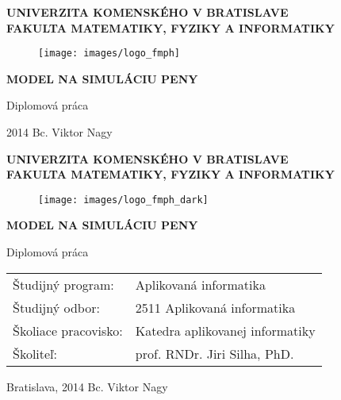 \documentclass[12pt, a4paper, oneside]{book}
\newcommand\mftitle{Model na simuláciu peny}
\newcommand\mfthesistype{Diplomová práca}
\newcommand\mfauthor{Bc. Viktor Nagy}
\newcommand\mfadvisor{prof. RNDr. Jiri Silha, PhD.}
\newcommand\mfplacedate{Bratislava, 2014}
\newcommand\mfuniversity{UNIVERZITA KOMENSKÉHO V BRATISLAVE}
\newcommand\mffaculty{FAKULTA MATEMATIKY, FYZIKY A INFORMATIKY}
\begin{document}
\frontmatter

\thispagestyle{empty}

\noindent
\begin{minipage}{\textwidth}
\begin{center}
\textbf{\mfuniversity \\
\mffaculty}
\end{center}
\end{minipage}

\vfill
\begin{figure}[!hbt]
	\begin{center}
		\texttt{[image: images/logo\_fmph]}
		\label{img:logo}
	\end{center}
\end{figure}
\begin{center}
	\begin{minipage}{0.8\textwidth}
		\centerline{\textbf{\Large\MakeUppercase{\mftitle}}}
		\smallskip
		\centerline{\mfthesistype}
	\end{minipage}
\end{center}
\vfill
2014 \hfill
\mfauthor
\eject 

\thispagestyle{empty}

\noindent
\begin{minipage}{\textwidth}
\begin{center}
\textbf{\mfuniversity \\
\mffaculty}
\end{center}
\end{minipage}

\vfill
\begin{figure}[!hbt]
\begin{center}
\texttt{[image: images/logo\_fmph\_dark]}
\label{img:logo_dark}
\end{center}
\end{figure}
\begin{center}
\begin{minipage}{0.8\textwidth}
\centerline{\textbf{\Large\MakeUppercase{\mftitle}}}
\smallskip
\centerline{\mfthesistype}
\end{minipage}
\end{center}
\vfill
\begin{tabular}{l l}
Študijný program: & Aplikovaná informatika\\
Študijný odbor: & 2511 Aplikovaná informatika\\
Školiace pracovisko: & Katedra aplikovanej informatiky\\
Školiteľ: & \mfadvisor
\end{tabular}
\vfill
\noindent
\mfplacedate \hfill
\mfauthor
\eject 
\end{document}
